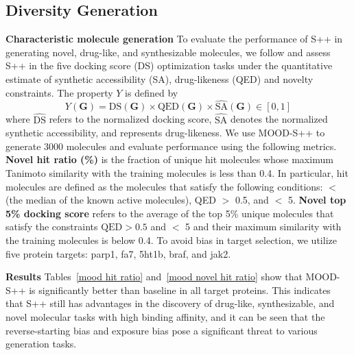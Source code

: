 \documentclass{article}
\newcommand{\G}{{{\bm G}}}
\begin{document}
\subsection{Diversity Generation}
\label{subsec:rapid_sample}
\textbf{Characteristic molecule generation} To evaluate the performance of S++ in generating novel, drug-like, and synthesizable molecules, we follow \citep{lee2023exploring} and assess S++ in the five docking score (DS) optimization tasks under the quantitative estimate of synthetic accessibility (SA), drug-likeness (QED) and novelty constraints. The property $Y$ is defined by
\begin{equation}
Y(\G)=\widehat{\text{DS}}(\G)\times\text{QED}(\G)\times\widehat{\text{SA}}(\G)\in[0,1]
\end{equation}
where $\widehat{\text{DS}}$ refers to the normalized docking score, $\widehat{\text{SA}}$ denotes the normalized synthetic accessibility, and  represents drug-likeness. We use MOOD-S++ to generate 3000 molecules and evaluate performance using the following metrics. \textbf{Novel hit ratio (\%)} is the fraction of unique hit molecules whose maximum Tanimoto similarity with the training molecules is less than 0.4. In particular, hit molecules are defined as the molecules that satisfy the following conditions:  $<$ (the median  of the known active molecules), QED $>$ 0.5, and  $<$ 5. \textbf{Novel top 5\% docking score} refers to the average  of the top 5\% unique molecules that satisfy the constraints $\text{QED}>0.5$ and  $<$ 5 and their maximum similarity with the training molecules is below 0.4. To avoid bias in target selection, we utilize five protein targets: parp1, fa7, 5ht1b, braf, and jak2.

\textbf{Results} Tables~\ref{mood hit ratio} and~\ref{mood novel hit ratio} show that MOOD-S++ is significantly better than baseline in all target proteins. This indicates that S++ still has advantages in the discovery of drug-like, synthesizable, and novel molecular tasks with high binding affinity, and it can be seen that the reverse-starting bias and exposure bias pose a significant threat to various generation tasks.
\end{document}
